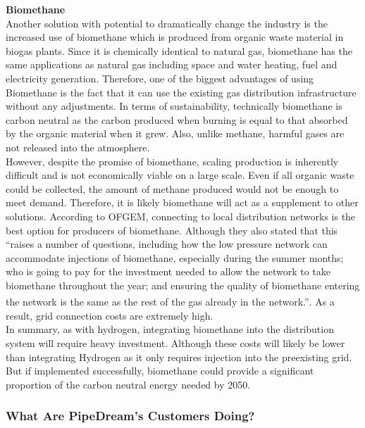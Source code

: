 \documentclass[11pt]{article}		%
\newcommand{\supercite}[1]{\textsuperscript{\cite{#1}}}		%
\begin{document}
            \textbf{Biomethane} \\
            Another solution with potential to dramatically change the industry is the increased use of biomethane which is produced from organic waste material in biogas plants. Since it is chemically identical to natural gas, biomethane has the same applications as natural gas including space and water heating, fuel and electricity generation. Therefore, one of the biggest advantages of using Biomethane is the fact that it can use the existing gas distribution infrastructure without any adjustments. In terms of sustainability, technically biomethane is carbon neutral as the carbon produced when burning is equal to that absorbed by the organic material when it grew. Also, unlike methane, harmful gases are not released into the atmosphere.\\
    	    \hspace*{3ex}However, despite the promise of biomethane, scaling production is inherently difficult and is not economically viable on a large scale. Even if all organic waste could be collected, the amount of methane produced would not be enough to meet demand. Therefore, it is likely biomethane will act as a supplement to other solutions. According to OFGEM, connecting to local distribution networks is the best option for producers of biomethane. Although they also stated that this “raises a number of questions, including how the low pressure network can accommodate injections of biomethane, especially during the summer months; who is going to pay for the investment needed to allow the network to take biomethane throughout the year; and ensuring the quality of biomethane entering the network is the same as the rest of the gas already in the network.”\supercite{biomethaneof}. As a result, grid connection costs are extremely high.\\
        	\hspace*{3ex}In summary, as with hydrogen, integrating biomethane into the distribution system will require heavy investment. Although these costs will likely be lower than integrating Hydrogen as it only requires injection into the preexisting grid. But if implemented successfully, biomethane could provide a significant proportion of the carbon neutral energy needed by 2050.
    
    		\subsubsection[What Are PipeDream's Customers Doing?]{What Are PipeDream's Customers Doing?}
    		
\end{document}
